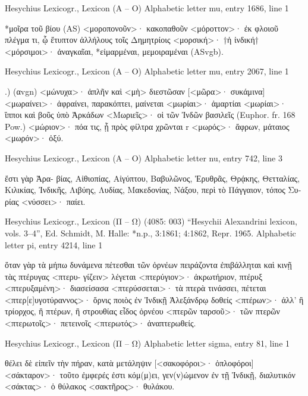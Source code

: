 \documentclass[12pt,letterpaper,twoside,final]{memoir}
\begin{document}
\begin{greek}
Hesychius Lexicogr., Lexicon (Α – Ο) 
Alphabetic letter mu, entry 1686, line 1

*μοῖρα τοῦ βίου (AS) 
<μοροπονοῦν>· κακοπαθοῦν 
<μόροττον>· ἐκ φλοιοῦ πλέγμα τι, ᾧ ἔτυπτον ἀλλήλους τοῖς 
 Δημητρίοις 
<μορσική>· †ἡ ἰνδική† 
<μόρσιμοι>· ἀναγκαῖαι, *εἱμαρμέναι, μεμοιραμέναι (ASvgb). 



Hesychius Lexicogr., Lexicon (Α – Ο) 
Alphabetic letter mu, entry 2067, line 1

                                                               .) (αvgn) 
<μώνυχα>· ἁπλῆν καὶ <μὴ> διεστῶσαν 
[<μῶρα>· συκάμινα] 
<μωραίνει>· ἀφραίνει, παρακόπτει, μαίνεται 
<μωρίαι>· ἁμαρτίαι 
<μωρίαι>· ἵπποι καὶ βοῦς ὑπὸ Ἀρκάδων 
<Μωριεῖς>· οἱ τῶν Ἰνδῶν βασιλεῖς (Euphor. fr. 168 Pow.) 
<μώριον>· πόα τις, ᾗ πρὸς φίλτρα χρῶνται r 
<μωρός>· ἄφρων, μάταιος 
<μωρόν>· ὀξύ. 



Hesychius Lexicogr., Lexicon (Α – Ο) 
Alphabetic letter nu, entry 742, line 3

                                                                   ἔστι γὰρ Ἀρα-
 βίας, Αἰθιοπίας, Αἰγύπτου, Βαβυλῶνος, Ἐρυθρᾶς, Θρᾴκης, 
 Θετταλίας, Κιλικίας, Ἰνδικῆς, Λιβύης, Λυδίας, Μακεδονίας, 
 Νάξου, περὶ τὸ Πάγγαιον, τόπος Συρίας 
<νύσσει>· παίει. 



Hesychius Lexicogr., Lexicon (Π – Ω) (4085: 003)
“Hesychii Alexandrini lexicon, vols. 3–4”, Ed. Schmidt, M.
Halle: *n.p., 3:1861; 4:1862, Repr. 1965.
Alphabetic letter pi, entry 4214, line 1

                                     ὅταν γὰρ τὰ μήπω δυνάμενα πέτεσθαι 
 τῶν ὀρνέων πειράζοντα ἐπιβάλληται καὶ κινῇ τὰς πτέρυγας <πτερυ-
 γίζειν> λέγεται 
<πτερύγιον>· ἀκρωτήριον, πτέρυξ 
<πτερυξαμένη>· διασείσασα 
<πτερύσσεται>· τὰ πτερὰ τινάσσει, πέτεται 
<πτερ[ε]υγοτύραννος>· ὄρνις ποιὸς ἐν Ἰνδικῇ Ἀλεξάνδρῳ δοθείς 
<πτέρων>· 
   ἀλλ' ἢ τρίορχος, ἢ πτέρων, ἢ στρουθίας 
 εἶδος ὀρνέου 
<πτερῶν ταρσοῦ>· τῶν πτερῶν 
<πτερωτοῖς>· πετεινοῖς 
<πτερωτός>· ἀναπτερωθείς. 



Hesychius Lexicogr., Lexicon (Π – Ω) 
Alphabetic letter sigma, entry 81, line 1

                                                       θέλει δὲ εἰπεῖν τὴν πήραν, 
 κατὰ μετάληψιν 
[<σακοφόροι>· ὁπλοφόροι] 
<σάκταρον>· τοῦτο ἐμφερές ἐστι κόμ(μ)ει, γεν(ν)ώμενον ἐν τῇ Ἰνδικῇ, 
 διαλυτικόν 
<σάκτας>· ὁ θύλακος 
<σακτῆρος>· θυλάκου. 




\end{greek}
\end{document}
